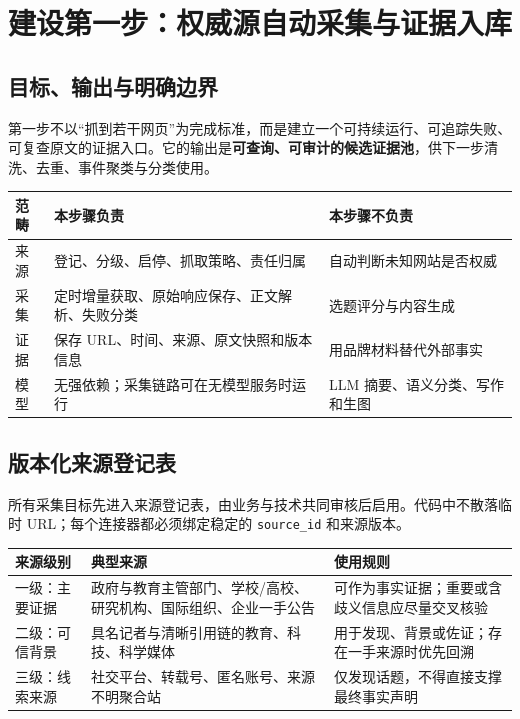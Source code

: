 \documentclass[UTF8,11pt,a4paper,fontset=none]{ctexart}
\begin{document}
\section{建设第一步：权威源自动采集与证据入库}

\subsection{目标、输出与明确边界}

第一步不以“抓到若干网页”为完成标准，而是建立一个可持续运行、可追踪失败、可复查原文的证据入口。它的输出是\textbf{可查询、可审计的候选证据池}，供下一步清洗、去重、事件聚类与分类使用。

\noindent\begin{tabularx}{\textwidth}{L{2.7cm}YY}
\toprule
{}
\color{white}\bfseries\sffamily 范畴 &
\color{white}\bfseries\sffamily 本步骤负责 &
\color{white}\bfseries\sffamily 本步骤不负责 \\
\midrule
来源 & 登记、分级、启停、抓取策略、责任归属 & 自动判断未知网站是否权威 \\
采集 & 定时增量获取、原始响应保存、正文解析、失败分类 & 选题评分与内容生成 \\
证据 & 保存 URL、时间、来源、原文快照和版本信息 & 用品牌材料替代外部事实 \\
模型 & 无强依赖；采集链路可在无模型服务时运行 & LLM 摘要、语义分类、写作和生图 \\
\bottomrule
\end{tabularx}

\subsection{版本化来源登记表}

所有采集目标先进入来源登记表，由业务与技术共同审核后启用。代码中不散落临时 URL；每个连接器都必须绑定稳定的 \texttt{source\_id} 和来源版本。

\noindent\begin{tabularx}{\textwidth}{L{2.55cm}L{3.5cm}Y}
\toprule
{}
\color{white}\bfseries\sffamily 来源级别 &
\color{white}\bfseries\sffamily 典型来源 &
\color{white}\bfseries\sffamily 使用规则 \\
\midrule
一级：主要证据 & 政府与教育主管部门、学校/高校、研究机构、国际组织、企业一手公告 & 可作为事实证据；重要或含歧义信息应尽量交叉核验 \\
二级：可信背景 & 具名记者与清晰引用链的教育、科技、科学媒体 & 用于发现、背景或佐证；存在一手来源时优先回溯 \\
三级：线索来源 & 社交平台、转载号、匿名账号、来源不明聚合站 & 仅发现话题，不得直接支撑最终事实声明 \\
\bottomrule
\end{tabularx}
\end{document}
